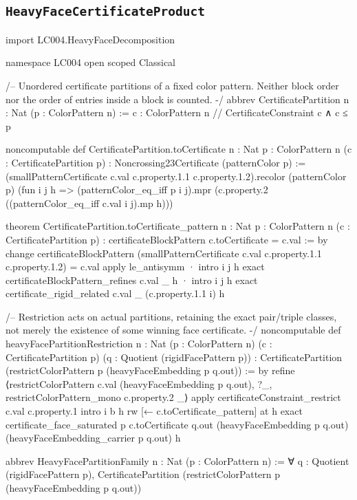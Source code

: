 \documentclass[11pt,reqno]{amsart}
\theoremstyle{definition}
\begin{document}
\subsection{\texorpdfstring{\texttt{HeavyFaceCertificateProduct}}{HeavyFaceCertificateProduct}}
\begin{LeanCode}
import LC004.HeavyFaceDecomposition

namespace LC004
open scoped Classical

/-- Unordered certificate partitions of a fixed color pattern. Neither
block order nor the order of entries inside a block is counted. -/
abbrev CertificatePartition {n : Nat} (p : ColorPattern n) :=
  {c : ColorPattern n // CertificateConstraint c ∧ c ≤ p}

noncomputable def CertificatePartition.toCertificate {n : Nat} {p : ColorPattern n}
    (c : CertificatePartition p) : Noncrossing23Certificate (patternColor p) :=
  (smallPatternCertificate c.val c.property.1.1 c.property.1.2).recolor
    (patternColor p) (fun i j h => (patternColor_eq_iff p i j).mpr
      (c.property.2 ((patternColor_eq_iff c.val i j).mp h)))

theorem CertificatePartition.toCertificate_pattern {n : Nat} {p : ColorPattern n}
    (c : CertificatePartition p) : certificateBlockPattern c.toCertificate = c.val := by
  change certificateBlockPattern
    (smallPatternCertificate c.val c.property.1.1 c.property.1.2) = c.val
  apply le_antisymm
  · intro i j h
    exact certificateBlockPattern_refines c.val _ h
  · intro i j h
    exact certificate_rigid_related c.val _ (c.property.1.1 i) h

/-- Restriction acts on actual partitions, retaining the exact pair/triple
classes, not merely the existence of some winning face certificate. -/
noncomputable def heavyFacePartitionRestriction {n : Nat} (p : ColorPattern n)
    (c : CertificatePartition p) (q : Quotient (rigidFacePattern p)) :
    CertificatePartition (restrictColorPattern p (heavyFaceEmbedding p q.out)) := by
  refine ⟨restrictColorPattern c.val (heavyFaceEmbedding p q.out), ?_,
    restrictColorPattern_mono c.property.2 _⟩
  apply certificateConstraint_restrict c.val c.property.1
  intro i b h
  rw [← c.toCertificate_pattern] at h
  exact certificate_face_saturated p c.toCertificate q.out (heavyFaceEmbedding p q.out)
    (heavyFaceEmbedding_carrier p q.out) h

abbrev HeavyFacePartitionFamily {n : Nat} (p : ColorPattern n) :=
  ∀ q : Quotient (rigidFacePattern p),
    CertificatePartition (restrictColorPattern p (heavyFaceEmbedding p q.out))


\end{LeanCode}
\end{document}
